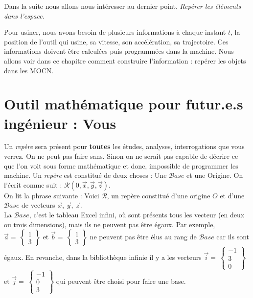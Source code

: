 \documentclass[
	11pt, %
	fleqn, %
	a4paper, %
]{LegrandOrangeBook}
\begin{document}
Dans la suite nous allons nous intéresser au dernier point. \textit{Repérer les éléments dans l'espace.} 

Pour usiner, nous avons besoin de plusieurs informations à chaque instant $t$, la position de l'outil qui usine, sa vitesse, son accélération, sa trajectoire. Ces informations doivent être calculées puis programmées dans la machine. Nous allons voir dans ce chapitre comment construire l'information : repérer les objets dans les MOCN.


\section{Outil mathématique pour futur.e.s ingénieur : Vous}

Un \textit{repère} sera présent pour \textbf{toutes} les études, analyses, interrogations que vous verrez. On ne peut pas faire sans. Sinon on ne serait pas capable de décrire ce que l'on voit sous forme mathématique et donc, impossible de programmer les machine. Un \textit{repère} est constitué de deux choses : Une $\mathcal{B}ase$ et une Origine. On l'écrit comme suit : $\mathcal{R}(0, \Vec{x}, \Vec{y}, \Vec{z})$.\\
On lit la phrase suivante : Voici $\mathcal{R}$, un repère constitué d'une origine $O$ et d'une $\mathcal{B}ase$ de vecteurs $\Vec{x}$, $\Vec{y}$, $\Vec{z}$. \\
La $\mathcal{B}ase$, c'est le tableau Excel infini, où sont présents tous les vecteur (en deux ou trois dimensions), mais ils ne peuvent pas être égaux. Par exemple, $\Vec{a}=\ \begin{Bmatrix} 1\\ 3 \end{Bmatrix} $ et $\Vec{b}=\ \begin{Bmatrix} 1\\ 3 \end{Bmatrix}$  ne peuvent pas être élus au rang de $\mathcal{B}ase$ car ils sont égaux. En revanche, dans la bibliothèque infinie il y a les vecteurs $\Vec{i}=\ \begin{Bmatrix} -1\\ 3 \\ 0 \end{Bmatrix} $ et $\Vec{j}=\ \begin{Bmatrix} -1\\ 0 \\ 3\end{Bmatrix}$ qui peuvent être choisi pour faire une base. \\
\end{document}
